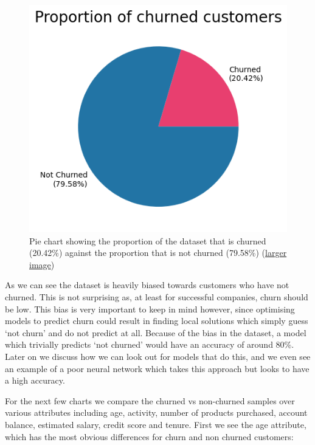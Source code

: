 \documentclass[]{article}
\begin{document}
\begin{figure}[h!]
	\centering
	\includegraphics[scale=0.5]{churn_proportion}
	\caption{Pie chart showing the proportion of the dataset that is churned (20.42\%) against the proportion that is not churned (79.58\%) (\href{https://github.com/ray33ee/Understanding-predicting-and-preventing-churn/blob/main/tex/churn_proportion.png?raw=true}{larger image})}
\end{figure}

As we can see the dataset is heavily biased towards customers who have not churned. This is not surprising as, at least for successful companies, churn should be low. This bias is very important to keep in mind however, since optimising models to predict churn could result in finding local solutions which simply guess ‘not churn’ and do not predict at all. Because of the bias in the dataset, a model which trivially predicts ‘not churned’ would have an accuracy of around 80\%. Later on we discuss how we can look out for models that do this, and we even see an example of a poor neural network which takes this approach but looks to have a high accuracy.

For the next few charts we compare the churned vs non-churned samples over various attributes including age, activity, number of products purchased, account balance, estimated salary, credit score and tenure. First we see the age attribute, which has the most obvious differences for churn and non churned customers:
\end{document}
